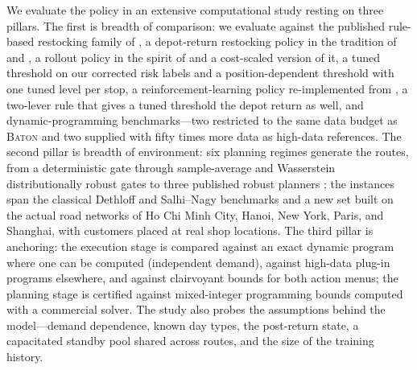 \documentclass[preprint,authoryear,12pt]{elsarticle}
\theoremstyle{definition}
\theoremstyle{remark}
\begin{document}
We evaluate the policy in an extensive computational study resting on
three pillars. The first is breadth of comparison: we evaluate against
the published rule-based restocking family of \citet{salavati2019rule},
a depot-return restocking policy in the tradition of
\citet{florio2020new} and \citet{legault2025superadditivity}, a rollout
policy in the spirit of \citet{secomandi2001rollout} and a cost-scaled
version of it, a tuned threshold on our corrected risk labels and a
position-dependent threshold with one tuned level per stop, a
reinforcement-learning policy re-implemented from
\citet{iklassov2024rl}, a two-lever rule that gives a tuned threshold the
depot return as well, and dynamic-programming benchmarks---two
restricted to the same data budget as \textsc{Baton} and two supplied
with fifty times more data as high-data references. The second pillar
is breadth of environment: six planning regimes generate the routes,
from a deterministic gate through sample-average and Wasserstein
distributionally robust gates to three published robust planners
\citep{gounaris2013robust,bertsimas2004price,ghosal2024unifying}; the
instances span the classical Dethloff and Salhi--Nagy benchmarks and a
new set built on the actual road networks of Ho Chi Minh City, Hanoi,
New York, Paris, and Shanghai, with customers placed at real shop
locations. The third pillar is anchoring: the execution stage is
compared against an exact dynamic program where one can be computed
(independent demand), against high-data plug-in programs elsewhere, and
against clairvoyant bounds for both action menus; the planning stage is
certified against mixed-integer programming bounds computed with a
commercial solver. The study also probes the assumptions behind the
model---demand dependence, known day types, the post-return state,
a capacitated standby pool shared across routes, and the size of the
training history.
\end{document}
